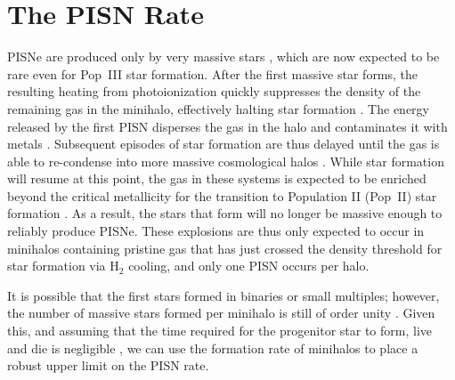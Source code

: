\documentclass[../thesis.tex]{subfiles}
\begin{document}
\section{The PISN Rate}
\label{sec:pisn_rate}
PISNe are produced only by very massive stars
\citep{BrommKudritzkiLoeb2001, Schaerer2002, Hegeretal2003}, which are
now expected to be rare even for Pop~III star formation.  After the
first massive star forms, the resulting heating from photoionization
quickly suppresses the density of the remaining gas in the minihalo,
effectively halting star formation \citep{Kitayamaetal2004,
  WhalenAbelNorman2004, AlvarezBrommShapiro2006}. The energy released
by the first PISN disperses the gas in the halo and contaminates it
with metals \citep{BrommYoshidaHernquist2003, Greifetal2007,
  Whalenetal2008, WiseAbel2008, Greifetal2010}.  Subsequent episodes
of star formation are thus delayed until the gas is able to re-condense
into more massive cosmological halos \citep{YoshidaBrommHernquist2004,
  Yoshidaetal2007, JohnsonGreifBromm2007, AlvarezWiseAbel2009}.  While
star formation will resume at this point, the gas in these systems is
expected to be enriched beyond the critical metallicity for the
transition to Population II (Pop~II) star formation \citep{WiseAbel2007, WiseAbel2008,
  Greifetal2007, Greifetal2008, Greifetal2010}. As a result, the stars
that form will no longer be massive enough to reliably produce PISNe.
These explosions are thus only expected to occur in minihalos
containing pristine gas that has just crossed the density threshold
for star formation via H$_2$ cooling, and only one PISN occurs per halo.

It is possible that the first stars formed in binaries or small
multiples; however, the number of massive stars formed per minihalo is
still of order unity \citep{StacyGreifBromm2010, Clarketal2011b,
  Greifetal2011}.  Given this, and assuming that the time required for the
progenitor star to form, live and die is negligible
\citep{Hegeretal2003}, we can use the formation rate of minihalos to
place a robust upper limit on the PISN rate.
\end{document}
